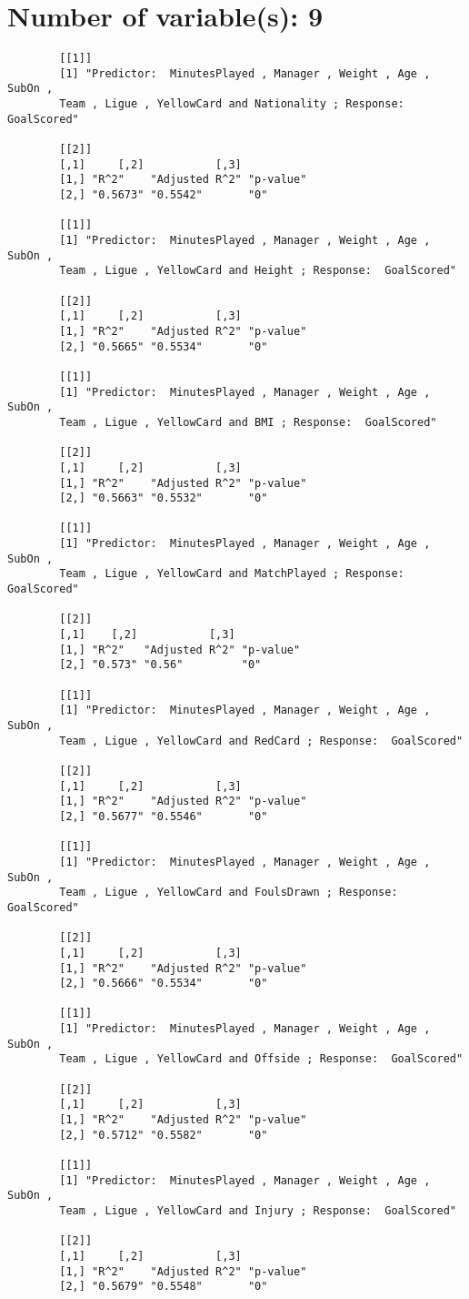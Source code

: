 \documentclass[12pt]{article}
\begin{document}
	\section{Number of variable(s): 9}
	\begin{verbatim}
		[[1]]
		[1] "Predictor:  MinutesPlayed , Manager , Weight , Age , SubOn , 
		Team , Ligue , YellowCard and Nationality ; Response:  GoalScored"
		
		[[2]]
		[,1]     [,2]           [,3]     
		[1,] "R^2"    "Adjusted R^2" "p-value"
		[2,] "0.5673" "0.5542"       "0"      
		
		[[1]]
		[1] "Predictor:  MinutesPlayed , Manager , Weight , Age , SubOn , 
		Team , Ligue , YellowCard and Height ; Response:  GoalScored"
		
		[[2]]
		[,1]     [,2]           [,3]     
		[1,] "R^2"    "Adjusted R^2" "p-value"
		[2,] "0.5665" "0.5534"       "0"      
		
		[[1]]
		[1] "Predictor:  MinutesPlayed , Manager , Weight , Age , SubOn , 
		Team , Ligue , YellowCard and BMI ; Response:  GoalScored"
		
		[[2]]
		[,1]     [,2]           [,3]     
		[1,] "R^2"    "Adjusted R^2" "p-value"
		[2,] "0.5663" "0.5532"       "0"      
		
		[[1]]
		[1] "Predictor:  MinutesPlayed , Manager , Weight , Age , SubOn , 
		Team , Ligue , YellowCard and MatchPlayed ; Response:  GoalScored"
		
		[[2]]
		[,1]    [,2]           [,3]     
		[1,] "R^2"   "Adjusted R^2" "p-value"
		[2,] "0.573" "0.56"         "0"      
		
		[[1]]
		[1] "Predictor:  MinutesPlayed , Manager , Weight , Age , SubOn , 
		Team , Ligue , YellowCard and RedCard ; Response:  GoalScored"
		
		[[2]]
		[,1]     [,2]           [,3]     
		[1,] "R^2"    "Adjusted R^2" "p-value"
		[2,] "0.5677" "0.5546"       "0"      
		
		[[1]]
		[1] "Predictor:  MinutesPlayed , Manager , Weight , Age , SubOn , 
		Team , Ligue , YellowCard and FoulsDrawn ; Response:  GoalScored"
		
		[[2]]
		[,1]     [,2]           [,3]     
		[1,] "R^2"    "Adjusted R^2" "p-value"
		[2,] "0.5666" "0.5534"       "0"      
		
		[[1]]
		[1] "Predictor:  MinutesPlayed , Manager , Weight , Age , SubOn , 
		Team , Ligue , YellowCard and Offside ; Response:  GoalScored"
		
		[[2]]
		[,1]     [,2]           [,3]     
		[1,] "R^2"    "Adjusted R^2" "p-value"
		[2,] "0.5712" "0.5582"       "0"      
		
		[[1]]
		[1] "Predictor:  MinutesPlayed , Manager , Weight , Age , SubOn , 
		Team , Ligue , YellowCard and Injury ; Response:  GoalScored"
		
		[[2]]
		[,1]     [,2]           [,3]     
		[1,] "R^2"    "Adjusted R^2" "p-value"
		[2,] "0.5679" "0.5548"       "0"      
		
	\end{verbatim}
	
\end{document}
